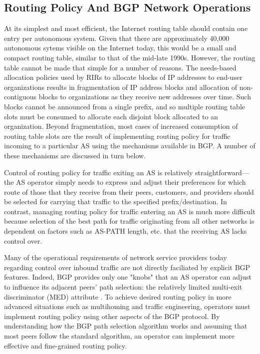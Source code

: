 \subsection{Routing Policy And BGP Network Operations}

At its simplest and most efficient, the Internet routing table should contain one entry per autonomous system. Given that there are approximately 40,000 autonomous sytems visible on the Internet today, this would be a small and compact routing table, similar to that of the mid-late 1990s. However, the routing table cannot be made that simple for a number of reasons. The needs-based allocation policies used by RIRs \cite{RFC2050} to allocate blocks of IP addresses to end-user organizations results in fragmentation of IP address blocks and allocation of non-contiguous blocks to organizations as they receive new addresses over time. Such blocks cannot be announced from a single prefix, and so multiple routing table slots must be consumed to allocate each disjoint block allocated to an organization. Beyond fragmentation, most cases of increased consumption of routing table slots are the result of implementing routing policy for traffic incoming to a particular AS using the mechanisms available in BGP. A number of these mechanisms are discussed in turn below.

Control of routing policy for traffic exiting an AS is relatively straightforward---the AS operator simply needs to express and adjust their preferences for which route of those that they receive from their peers, customers, and providers should be selected for carrying that traffic to the specified prefix/destination. In contrast, managing routing policy for traffic entering an AS is much more difficult because selection of the best path for traffic originating from all other networks is dependent on factors such as AS-PATH length, etc. that the receiving AS lacks control over.

Many of the operational requirements of network service providers today regarding control over inbound traffic are not directly faciliated by explicit BGP features. Indeed, BGP provides only one "knobs" that an AS operator can adjust to influence its adjacent peers' path selection: the relatively limited multi-exit discriminator (MED) attribute \cite{O'Reilly BGP book?}. To achieve desired routing policy in more advanced situations such as multihoming and traffic engineering, operators must implement routing policy using other aspects of the BGP protocol. By understanding how the BGP path selection algorithm works and assuming that most peers follow the standard algorithm, an operator can implement more effective and fine-grained routing policy.


